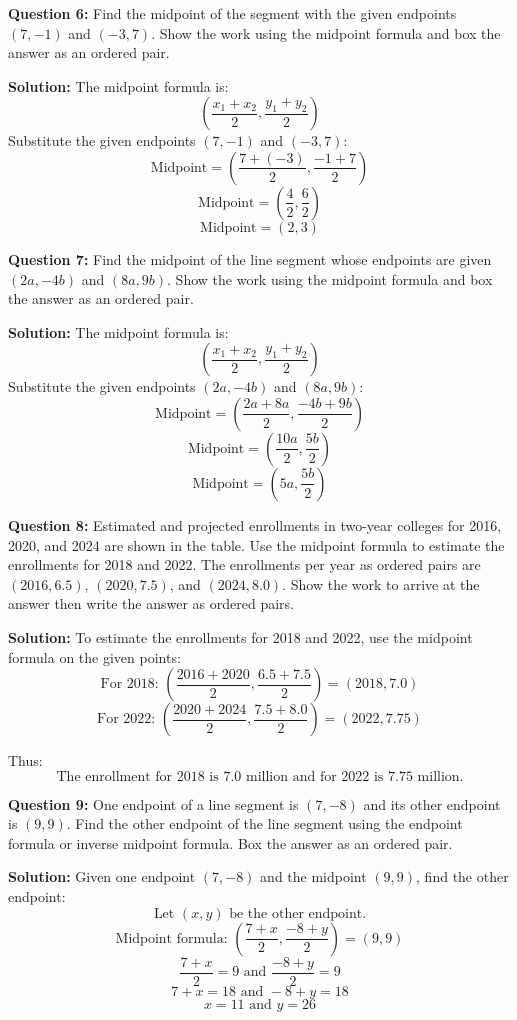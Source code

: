 \documentclass{article}
\begin{document}
\textbf{Question 6:} Find the midpoint of the segment with the given endpoints \((7, -1)\) and \((-3, 7)\). Show the work using the midpoint formula and box the answer as an ordered pair.

\textbf{Solution:}
The midpoint formula is:
\[
\left(\frac{x_1 + x_2}{2}, \frac{y_1 + y_2}{2}\right)
\]
Substitute the given endpoints \((7, -1)\) and \((-3, 7)\):
\[
\text{Midpoint} = \left(\frac{7 + (-3)}{2}, \frac{-1 + 7}{2}\right)
\]
\[
\text{Midpoint} = \left(\frac{4}{2}, \frac{6}{2}\right)
\]
\[
\text{Midpoint} = \boxed{(2, 3)}
\]

\textbf{Question 7:} Find the midpoint of the line segment whose endpoints are given \((2a, -4b)\) and \((8a, 9b)\). Show the work using the midpoint formula and box the answer as an ordered pair.

\textbf{Solution:}
The midpoint formula is:
\[
\left(\frac{x_1 + x_2}{2}, \frac{y_1 + y_2}{2}\right)
\]
Substitute the given endpoints \((2a, -4b)\) and \((8a, 9b)\):
\[
\text{Midpoint} = \left(\frac{2a + 8a}{2}, \frac{-4b + 9b}{2}\right)
\]
\[
\text{Midpoint} = \left(\frac{10a}{2}, \frac{5b}{2}\right)
\]
\[
\text{Midpoint} = \boxed{(5a, \frac{5b}{2})}
\]

\textbf{Question 8:} Estimated and projected enrollments in two-year colleges for 2016, 2020, and 2024 are shown in the table. Use the midpoint formula to estimate the enrollments for 2018 and 2022. The enrollments per year as ordered pairs are \((2016, 6.5)\), \((2020, 7.5)\), and \((2024, 8.0)\). Show the work to arrive at the answer then write the answer as ordered pairs.

\textbf{Solution:}
To estimate the enrollments for 2018 and 2022, use the midpoint formula on the given points:
\[
\text{For 2018: } \left(\frac{2016 + 2020}{2}, \frac{6.5 + 7.5}{2}\right) = (2018, 7.0)
\]
\[
\text{For 2022: } \left(\frac{2020 + 2024}{2}, \frac{7.5 + 8.0}{2}\right) = (2022, 7.75)
\]

Thus:
\[
\text{The enrollment for 2018 is } \boxed{7.0} \text{ million and for 2022 is } \boxed{7.75} \text{ million.}
\]

\textbf{Question 9:} One endpoint of a line segment is \((7, -8)\) and its other endpoint is \((9, 9)\). Find the other endpoint of the line segment using the endpoint formula or inverse midpoint formula. Box the answer as an ordered pair.

\textbf{Solution:}
Given one endpoint \((7, -8)\) and the midpoint \((9, 9)\), find the other endpoint:
\[
\text{Let } (x, y) \text{ be the other endpoint.}
\]
\[
\text{Midpoint formula: } \left(\frac{7 + x}{2}, \frac{-8 + y}{2}\right) = (9, 9)
\]
\[
\frac{7 + x}{2} = 9 \text{ and } \frac{-8 + y}{2} = 9
\]
\[
7 + x = 18 \text{ and } -8 + y = 18
\]
\[
x = 11 \text{ and } y = 26
\]
\end{document}

